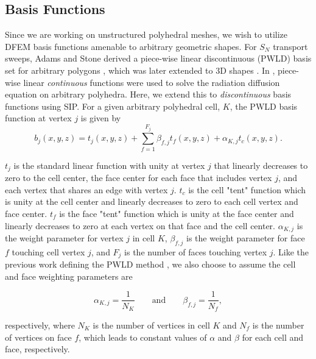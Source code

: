\documentclass{anstrans}
\begin{document}
\subsection{Basis Functions}
\label{sec::PWLD}
%
Since we are working on unstructured polyhedral meshes, we wish to utilize DFEM basis functions amenable to arbitrary geometric shapes. For $S_N$ transport sweeps, Adams and Stone derived a piece-wise linear discontinuous (PWLD) basis set for arbitrary polygons \cite{ref::PWLD_stone_adams_unstructured}, which was later extended to 3D shapes \cite{bailey2008phd}. In \cite{bailey_jcp_diffusion}, piece-wise linear {\it continuous} functions were used to solve the radiation diffusion equation on arbitrary polyhedra. Here, we extend this to {\it discontinuous} basis functions using SIP.
%
For a given arbitrary polyhedral cell, $K$, the PWLD basis function at vertex $j$ is given by
%
\begin{equation}
b_j(x,y,z) = t_j(x,y,z) + \sum_{f=1}^{F_j} \beta_{f,j} t_f(x,y,z) + \alpha_{K,j} t_c(x,y,z) .
\label{eq::3D_PWLD_basis_functions}
\end{equation}

\noindent $t_j$ is the standard linear function with unity at vertex $j$ that linearly decreases to zero to the cell center, the face center for each face that includes vertex $j$, and each vertex that shares an edge with vertex $j$. $t_c$ is the cell "tent" function which is unity at the cell center and linearly decreases to zero to each cell vertex and face center. $t_f$ is the face "tent" function which is unity at the face center and linearly decreases to zero at each vertex on that face and the cell center. $\alpha_{K,j}$ is the weight parameter for vertex $j$ in cell $K$, $\beta_{f,j}$ is the weight parameter for face $f$ touching cell vertex $j$, and $F_j$ is the number of faces touching vertex $j$. Like the previous work defining the PWLD method \cite{bailey2008phd}, we also choose to assume the cell and face weighting parameters are


\begin{equation}
\alpha_{K,j} = \frac{1}{N_K} \qquad \text{and} \qquad \beta_{f,j} = \frac{1}{N_f},
\label{eq::PWLD_weight_vals}
\end{equation}

\noindent respectively, where $N_K$ is the number of vertices in cell $K$ and $N_f$ is the number of vertices on face $f$, which leads to constant values of $\alpha$ and $\beta$ for each cell and face, respectively.
\end{document}
